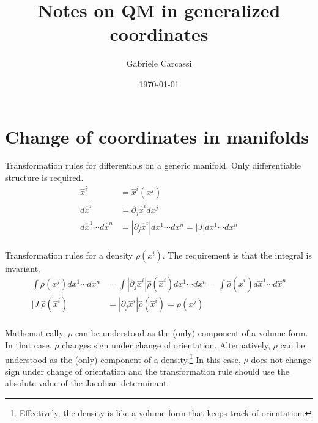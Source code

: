 \documentclass[11pt]{article}
\begin{document}
\title{Notes on QM in generalized coordinates}
\author{Gabriele Carcassi}

\date{\today}

\maketitle

\begin{abstract}
\end{abstract}

\section{Change of coordinates in manifolds}
Transformation rules for differentials on a generic manifold. Only differentiable structure is required.
\begin{equation}
	\begin{aligned}
		\hat{x}^i &= \hat{x}^i(x^j) \\
		d\hat{x}^i &= \partial_j \hat{x}^i dx^j \\
		d\hat{x}^1 \cdots d\hat{x}^n &= | \partial_j \hat{x}^i | dx^1 \cdots dx^n = |J| dx^1 \cdots dx^n \\
	\end{aligned}
\end{equation}

Transformation rules for a density $\rho(x^i)$. The requirement is that the integral is invariant.
\begin{equation}
	\begin{aligned}
		\int \rho(x^j) dx^1 \cdots dx^n &= \int | \partial_j \hat{x}^i | \hat{\rho}(\hat{x}^i) dx^1 \cdots dx^n = \int \hat{\rho}(\hat{x}^i) d\hat{x}^1 \cdots d\hat{x}^n \\
		|J| \hat{\rho}(\hat{x}^i) &= | \partial_j \hat{x}^i | \hat{\rho}(\hat{x}^i)  = \rho(x^j) \\
	\end{aligned}
\end{equation}

Mathematically, $\rho$ can be understood as the (only) component of a volume form. In that case, $\rho$ changes sign under change of orientation. Alternatively, $\rho$ can be understood as the (only) component of a density.\footnote{Effectively, the density is like a volume form that keeps track of orientation.} In this case, $\rho$ does not change sign under change of orientation and the transformation rule should use the absolute value of the Jacobian determinant.
\end{document}
